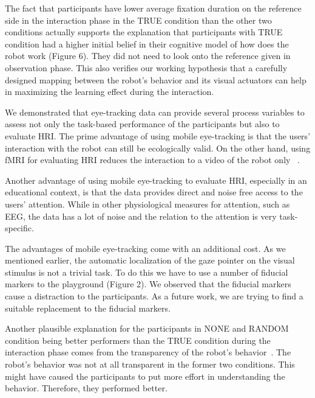 \documentclass{sig-alternate}
\begin{document}
The fact that participants have lower average fixation duration on the
reference side in the interaction phase in the TRUE condition than the
other two conditions actually supports the explanation that participants
with TRUE condition had a higher initial belief in their cognitive model
of how does the robot work (Figure 6). They did not need to look onto
the reference given in observation phase. This also verifies our working
hypothesis that a carefully designed mapping between the robot's
behavior and its visual actuators can help in maximizing the learning
effect during the interaction.

We demonstrated that eye-tracking data can provide several process
variables to assess not only the task-based performance of the
participants but also to evaluate HRI. The prime advantage of using
mobile eye-tracking is that the users' interaction with the robot can
still be ecologically valid. On the other hand, using fMRI for
evaluating HRI reduces the interaction to a video of the robot only
~\cite{rosenthal2013neural}.

Another advantage of using mobile eye-tracking to evaluate HRI,
especially in an educational context, is that the data provides direct
and noise free access to the users' attention. While in other
physiological measures for attention, such as EEG, the data has a lot of
noise and the relation to the attention is very task-specific.

The advantages of mobile eye-tracking come with an additional cost. As
we mentioned earlier, the automatic localization of the gaze pointer on
the visual stimulus is not a trivial task. To do this we have to use a
number of fiducial markers to the playground (Figure 2). We observed
that the fiducial markers cause a distraction to the participants. As a
future work, we are trying to find a suitable replacement to the
fiducial markers.

Another plausible explanation for the participants in NONE and RANDOM condition
being better performers than the TRUE condition during the interaction phase
comes from the transparency of the robot's behavior~\cite{??}. The robot's
behavior was not at all transparent in the former two conditions. This might
have caused the participants to put more effort in understanding the behavior.
Therefore, they performed better.

\end{document}
